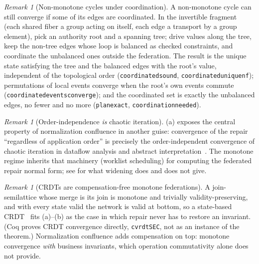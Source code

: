 \documentclass[11pt,a4paper]{article}
\theoremstyle{plain}
\theoremstyle{definition}
\theoremstyle{remark}
\newtheorem{remark}[theorem]{Remark}
\renewcommand{\_}{\textunderscore\allowbreak}
\begin{document}
\begin{remark}[Non-monotone cycles under coordination]
\label{rem:coordinated-cycles}
A non-monotone cycle can still converge if some of its edges are coordinated.
In the invertible fragment (each shared fiber a group acting on itself, each
edge a transport by a group element), pick an authority root and a spanning
tree; drive values along the tree, keep the non-tree edges whose loop is
balanced as checked constraints, and coordinate the unbalanced ones outside the
federation.  The result is the unique state satisfying the tree and the
balanced edges with the root's value, independent of the topological order
(\texttt{coordinated\_sound}, \texttt{coordinated\_unique\_nf}); permutations
of local events converge when the root's own events commute
(\texttt{coordinated\_events\_converge}); and the coordinated set is exactly the
unbalanced edges, no fewer and no more (\texttt{plan\_exact},
\texttt{coordination\_needed}).
\end{remark}

\begin{remark}[Order-independence \emph{is} chaotic iteration]
(a) exposes the central property of normalization
confluence in another guise: convergence of the repair ``regardless of
application order'' is precisely the order-independent convergence of chaotic
iteration in dataflow analysis and abstract interpretation~\cite{cousot1977}.
The monotone regime inherits that machinery (worklist scheduling) for computing
the federated repair normal form; see  for what
widening does and does not give.
\end{remark}

\begin{remark}[CRDTs are compensation-free monotone federations]
A join-semilattice whose merge is its join is monotone and trivially
validity-preserving, and with every state valid the network is valid at bottom,
so a state-based CRDT~\cite{shapiro2011crdt} fits
(a)--(b) as the case in which repair never has to
restore an invariant.  (Coq proves CRDT convergence directly,
\texttt{cvrdt\_SEC}, not as an instance of the theorem.)  Normalization
confluence adds compensation on top: monotone convergence \emph{with} business
invariants, which operation commutativity alone does not provide.
\end{remark}
\end{document}
